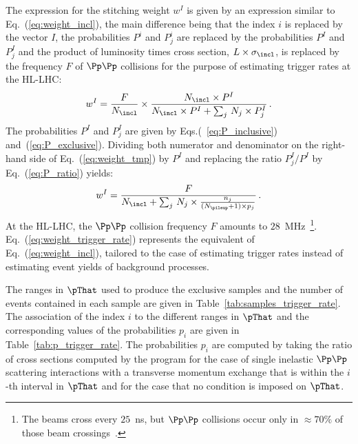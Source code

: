 The expression for the stitching weight $w^{I}$ is given by an expression similar to Eq.~(\ref{eq:weight_incl}),
the main difference being that the index $i$ is replaced by the vector $I$,
the probabilities $P^{i}$ and $P_{j}^{i}$ are replaced by the probabilities $P^{I}$ and $P_{j}^{I}$
and the product of luminosity times cross section, $L \times \sigma_{\incl}$, is replaced by the frequency $F$ of $\Pp\Pp$ collisions 
for the purpose of estimating trigger rates at the HL-LHC:
\begin{equation}
w^{I} = \frac{F}{N_{\incl}} \times \frac{N_{\incl} \times P^{I}}{N_{\incl} \times P^{I} + \sum_{j} \, N_{j} \times P_{j}^{I}} \, .
\label{eq:weight_tmp}
\end{equation}
The probabilities $P^{I}$ and $P_{j}^{I}$ are given by Eqs.(~\ref{eq:P_inclusive}) and~(\ref{eq:P_exclusive}).
Dividing both numerator and denominator on the right-hand side of Eq.~(\ref{eq:weight_tmp}) by $P^{I}$ and replacing the ratio $P_{j}^{I}/P^{I}$ by Eq.~(\ref{eq:P_ratio}) yields:
\begin{equation}
w^{I} = \frac{F}{N_{\incl} + \sum_{j} \, N_{j} \times \frac{n_{j}}{(N_{\pileup} + 1) \times p_{j}}} \, .
\label{eq:weight_trigger_rate}
\end{equation}
At the HL-LHC, the $\Pp\Pp$ collision frequency $F$ amounts to $28$~MHz~\footnote{
  The beams cross every $25$~ns, but $\Pp\Pp$ collisions occur only in $\approx 70\%$ of those beam crossings~\cite{TDR_Phase2_LHC}.}.
Eq.~(\ref{eq:weight_trigger_rate}) represents the equivalent of Eq.~(\ref{eq:weight_incl}),
tailored to the case of estimating trigger rates instead of estimating event yields of background processes.

The ranges in $\pThat$ used to produce the exclusive samples and the number of events contained in each sample
are given in Table~\ref{tab:samples_trigger_rate}.
The association of the index $i$ to the different ranges in $\pThat$ and the 
corresponding values of the probabilities $p_{i}$ are given in Table~\ref{tab:p_trigger_rate}.
The probabilities $p_{i}$ are computed by taking the ratio of cross sections computed by the program \PYTHIA
for the case of single inelastic $\Pp\Pp$ scattering interactions with a transverse momentum exchange that is within the $i$-th interval in $\pThat$
and for the case that no condition is imposed on $\pThat$.


